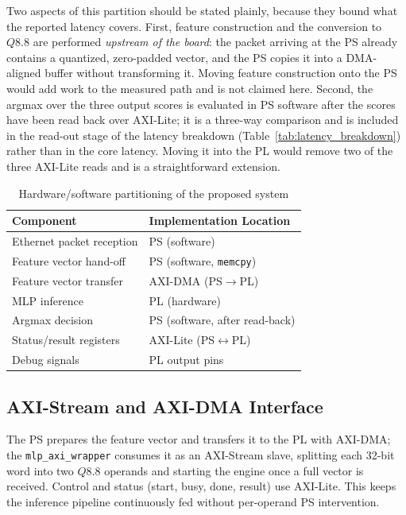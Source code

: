 \documentclass[final,5p,times,twocolumn]{elsarticle}
\begin{document}
Two aspects of this partition should be stated plainly, because they bound what
the reported latency covers. First, feature construction and the conversion to
$Q8.8$ are performed \emph{upstream of the board}: the packet arriving at the PS
already contains a quantized, zero-padded vector, and the PS copies it into a
DMA-aligned buffer without transforming it. Moving feature construction onto the
PS would add work to the measured path and is not claimed here. Second, the
argmax over the three output scores is evaluated in PS software after the scores
have been read back over AXI-Lite; it is a three-way comparison and is included
in the read-out stage of the latency breakdown
(Table~\ref{tab:latency_breakdown}) rather than in the core latency. Moving it
into the PL would remove two of the three AXI-Lite reads and is a
straightforward extension.

\begin{table}[t]
\centering
\caption{Hardware/software partitioning of the proposed system}
\label{tab:hw_sw_partitioning}
\begin{tabular}{p{2.8cm} p{4.6cm}}
\toprule
Component & Implementation Location \\
\midrule
Ethernet packet reception & PS (software) \\
Feature vector hand-off & PS (software, \texttt{memcpy}) \\
Feature vector transfer & AXI-DMA (PS$\rightarrow$PL) \\
MLP inference & PL (hardware) \\
Argmax decision & PS (software, after read-back) \\
Status/result registers & AXI-Lite (PS$\leftrightarrow$PL) \\
Debug signals & PL output pins \\
\bottomrule
\end{tabular}
\end{table}

\subsection{AXI-Stream and AXI-DMA Interface}
The PS prepares the feature vector and transfers it to the PL with AXI-DMA; the
\texttt{mlp\_axi\_wrapper} consumes it as an AXI-Stream slave, splitting each
32-bit word into two $Q8.8$ operands and starting the engine once a full vector
is received. Control and status (start, busy, done, result) use AXI-Lite. This
keeps the inference pipeline continuously fed without per-operand PS
intervention.
\end{document}
